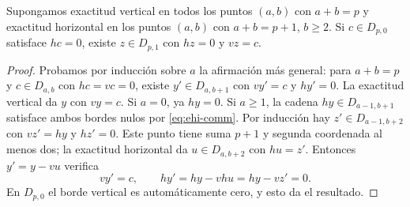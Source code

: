 \begin{lema}
\label{lem:ehi-zig}
Supongamos exactitud vertical en todos los puntos $(a,b)$ con $a+b=p$ y exactitud horizontal en los puntos $(a,b)$ con $a+b=p+1$, $b\ge2$. Si $c\in D_{p,0}$ satisface $hc=0$, existe $z\in D_{p,1}$ con $hz=0$ y $vz=c$.
\end{lema}
\begin{proof}
Probamos por inducción sobre $a$ la afirmación más general: para $a+b=p$ y $c\in D_{a,b}$ con $hc=vc=0$, existe $y'\in D_{a,b+1}$ con $vy'=c$ y $hy'=0$. La exactitud vertical da $y$ con $vy=c$. Si $a=0$, ya $hy=0$. Si $a\ge1$, la cadena $hy\in D_{a-1,b+1}$ satisface ambos bordes nulos por \eqref{eq:ehi-comm}. Por inducción hay $z'\in D_{a-1,b+2}$ con $vz'=hy$ y $hz'=0$. Este punto tiene suma $p+1$ y segunda coordenada al menos dos; la exactitud horizontal da $u\in D_{a,b+2}$ con $hu=z'$. Entonces $y'=y-vu$ verifica
\[
 vy'=c,\qquad hy'=hy-vhu=hy-vz'=0.
\]
En $D_{p,0}$ el borde vertical es automáticamente cero, y esto da el resultado.
\end{proof}

